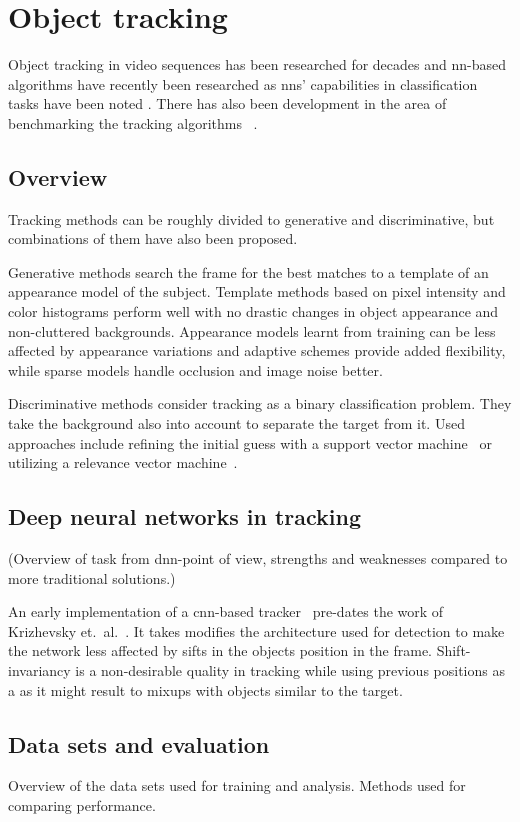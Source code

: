 \section{Object tracking}
Object tracking in video sequences has been researched for decades and \ac{nn}-based
algorithms have recently been researched  as \ac{nn}s'
capabilities in classification tasks have been noted .
There has also been development in the area of benchmarking the tracking algorithms
~\cite{OT_BENCH}.

\subsection{Overview}
Tracking methods can be roughly divided to generative and discriminative, but combinations
of them have also been proposed.

Generative methods search the frame for the best matches
to a template of an appearance model of the subject. Template methods based on pixel
intensity and color histograms perform well with no drastic changes in object appearance
and non-cluttered backgrounds. Appearance models learnt from training can be less affected
by appearance variations and adaptive schemes provide added flexibility, while sparse
models handle occlusion and image noise better.~\cite{OBJECT_PLS}

Discriminative methods consider tracking as a binary classification problem. They take
the background also into account to separate the target from it. Used approaches
include refining the initial guess with a support vector machine~\cite{SVT} or utilizing
a relevance vector machine~\cite{SPARSE_BAYESIAN}.

\subsection{Deep neural networks in tracking}
(Overview of task from \ac{dnn}-point of view, strengths and weaknesses compared to
more traditional solutions.)

An early implementation of a \ac{cnn}-based tracker~\cite{HUMAN_CNN} pre-dates the work
of Krizhevsky et.~al.~\cite{NIPS_IMAGENET}. It takes modifies the architecture used for
detection to make the network less affected by sifts in the objects position in the
frame. Shift-invariancy is a non-desirable quality in tracking while using previous
positions as a as it might result to mixups with objects similar to the target.~\cite{HUMAN_CNN}

\subsection{Data sets and evaluation}
Overview of the data sets used for training and analysis. Methods used for comparing
performance.
